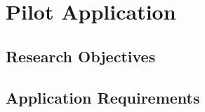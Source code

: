 \section{Pilot Application}

\subsection{Research Objectives}

\subsection{Application Requirements} 

